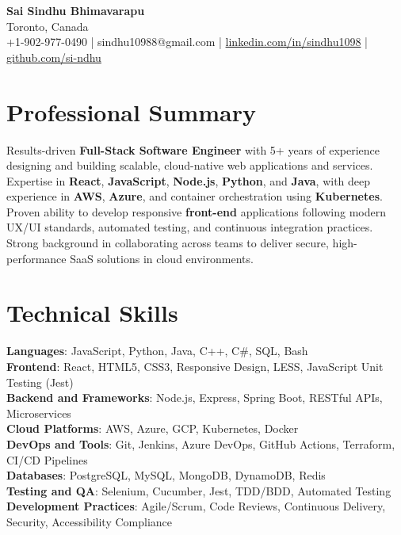 \documentclass[letterpaper,11pt]{article}
\begin{document}
\begin{center}
  {\Large \textbf{Sai Sindhu Bhimavarapu}} \\
  Toronto, Canada \\
  +1-902-977-0490 \enspace | \enspace sindhu10988@gmail.com \enspace | \enspace \href{https://www.linkedin.com/in/sindhu1098/}{linkedin.com/in/sindhu1098} \enspace | \enspace \href{https://github.com/si-ndhu}{github.com/si-ndhu}
\end{center}

\section{Professional Summary}
  \begin{itemize}[leftmargin=0.15in, label={}]
    \small{\item{
     Results-driven \textbf{Full-Stack Software Engineer} with 5+ years of experience designing and building scalable, cloud-native web applications and services. Expertise in \textbf{React}, \textbf{JavaScript}, \textbf{Node.js}, \textbf{Python}, and \textbf{Java}, with deep experience in \textbf{AWS}, \textbf{Azure}, and container orchestration using \textbf{Kubernetes}. Proven ability to develop responsive \textbf{front-end} applications following modern UX/UI standards, automated testing, and continuous integration practices. Strong background in collaborating across teams to deliver secure, high-performance SaaS solutions in cloud environments.
    }}
  \end{itemize}
\vspace{-16pt}

\section{Technical Skills}
 \begin{itemize}[leftmargin=0.15in, label={}]
    \small{\item{
     \textbf{Languages}: JavaScript, Python, Java, C++, C\#, SQL, Bash \\
     \textbf{Frontend}: React, HTML5, CSS3, Responsive Design, LESS, JavaScript Unit Testing (Jest) \\
     \textbf{Backend and Frameworks}: Node.js, Express, Spring Boot, RESTful APIs, Microservices \\
     \textbf{Cloud Platforms}: AWS, Azure, GCP, Kubernetes, Docker \\
     \textbf{DevOps and Tools}: Git, Jenkins, Azure DevOps, GitHub Actions, Terraform, CI/CD Pipelines \\
     \textbf{Databases}: PostgreSQL, MySQL, MongoDB, DynamoDB, Redis \\
     \textbf{Testing and QA}: Selenium, Cucumber, Jest, TDD/BDD, Automated Testing \\
     \textbf{Development Practices}: Agile/Scrum, Code Reviews, Continuous Delivery, Security, Accessibility Compliance \\
    }}
 \end{itemize}
\vspace{-16pt}
\end{document}

